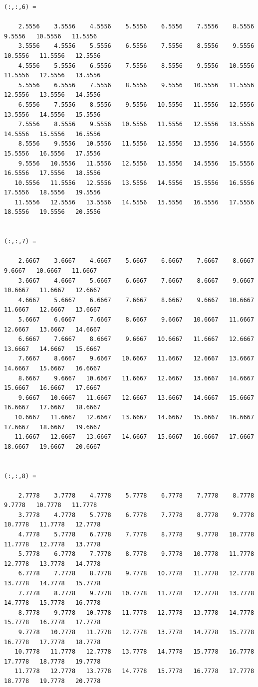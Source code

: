 \documentclass[
]{book}
\begin{document}
\begin{verbatim}
(:,:,6) =

    2.5556    3.5556    4.5556    5.5556    6.5556    7.5556    8.5556    9.5556   10.5556   11.5556
    3.5556    4.5556    5.5556    6.5556    7.5556    8.5556    9.5556   10.5556   11.5556   12.5556
    4.5556    5.5556    6.5556    7.5556    8.5556    9.5556   10.5556   11.5556   12.5556   13.5556
    5.5556    6.5556    7.5556    8.5556    9.5556   10.5556   11.5556   12.5556   13.5556   14.5556
    6.5556    7.5556    8.5556    9.5556   10.5556   11.5556   12.5556   13.5556   14.5556   15.5556
    7.5556    8.5556    9.5556   10.5556   11.5556   12.5556   13.5556   14.5556   15.5556   16.5556
    8.5556    9.5556   10.5556   11.5556   12.5556   13.5556   14.5556   15.5556   16.5556   17.5556
    9.5556   10.5556   11.5556   12.5556   13.5556   14.5556   15.5556   16.5556   17.5556   18.5556
   10.5556   11.5556   12.5556   13.5556   14.5556   15.5556   16.5556   17.5556   18.5556   19.5556
   11.5556   12.5556   13.5556   14.5556   15.5556   16.5556   17.5556   18.5556   19.5556   20.5556


(:,:,7) =

    2.6667    3.6667    4.6667    5.6667    6.6667    7.6667    8.6667    9.6667   10.6667   11.6667
    3.6667    4.6667    5.6667    6.6667    7.6667    8.6667    9.6667   10.6667   11.6667   12.6667
    4.6667    5.6667    6.6667    7.6667    8.6667    9.6667   10.6667   11.6667   12.6667   13.6667
    5.6667    6.6667    7.6667    8.6667    9.6667   10.6667   11.6667   12.6667   13.6667   14.6667
    6.6667    7.6667    8.6667    9.6667   10.6667   11.6667   12.6667   13.6667   14.6667   15.6667
    7.6667    8.6667    9.6667   10.6667   11.6667   12.6667   13.6667   14.6667   15.6667   16.6667
    8.6667    9.6667   10.6667   11.6667   12.6667   13.6667   14.6667   15.6667   16.6667   17.6667
    9.6667   10.6667   11.6667   12.6667   13.6667   14.6667   15.6667   16.6667   17.6667   18.6667
   10.6667   11.6667   12.6667   13.6667   14.6667   15.6667   16.6667   17.6667   18.6667   19.6667
   11.6667   12.6667   13.6667   14.6667   15.6667   16.6667   17.6667   18.6667   19.6667   20.6667


(:,:,8) =

    2.7778    3.7778    4.7778    5.7778    6.7778    7.7778    8.7778    9.7778   10.7778   11.7778
    3.7778    4.7778    5.7778    6.7778    7.7778    8.7778    9.7778   10.7778   11.7778   12.7778
    4.7778    5.7778    6.7778    7.7778    8.7778    9.7778   10.7778   11.7778   12.7778   13.7778
    5.7778    6.7778    7.7778    8.7778    9.7778   10.7778   11.7778   12.7778   13.7778   14.7778
    6.7778    7.7778    8.7778    9.7778   10.7778   11.7778   12.7778   13.7778   14.7778   15.7778
    7.7778    8.7778    9.7778   10.7778   11.7778   12.7778   13.7778   14.7778   15.7778   16.7778
    8.7778    9.7778   10.7778   11.7778   12.7778   13.7778   14.7778   15.7778   16.7778   17.7778
    9.7778   10.7778   11.7778   12.7778   13.7778   14.7778   15.7778   16.7778   17.7778   18.7778
   10.7778   11.7778   12.7778   13.7778   14.7778   15.7778   16.7778   17.7778   18.7778   19.7778
   11.7778   12.7778   13.7778   14.7778   15.7778   16.7778   17.7778   18.7778   19.7778   20.7778



\end{verbatim}
\end{document}
